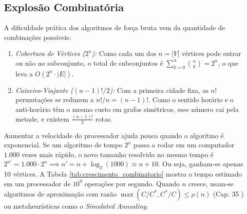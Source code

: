 \documentclass[conference]{IEEEtran}
\theoremstyle{definition}
\theoremstyle{plain}
\begin{document}
\subsection{Explosão Combinatória}

A dificuldade prática dos algoritmos de força bruta vem da quantidade de combinações possíveis:
\begin{enumerate}
    \item \textit{Cobertura de Vértices ($2^n$):} Como cada um dos $n = |V|$ vértices pode entrar ou não no subconjunto, o total de subconjuntos é $\sum_{k=0}^{n} \binom{n}{k} = 2^n$, o que leva a $O(2^n \cdot |E|)$.
    \item \textit{Caixeiro-Viajante ($(n-1)!/2$):} Com a primeira cidade fixa, as $n!$ permutações se reduzem a $n!/n = (n-1)!$. Como o sentido horário e o anti-horário têm o mesmo custo em grafos simétricos, esse número cai pela metade, e existem $\frac{(n-1)!}{2}$ rotas.
\end{enumerate}

Aumentar a velocidade do processador ajuda pouco quando o algoritmo é exponencial. Se um algoritmo de tempo $2^n$ passa a rodar em um computador $1.000$ vezes mais rápido, o novo tamanho resolvido no mesmo tempo é $2^{n'} = 1{.}000 \cdot 2^n \implies n' = n + \log_2(1000) \approx n + 10$. Ou seja, ganham-se apenas 10 vértices. A Tabela \ref{tab:crescimento_combinatorio} mostra o tempo estimado em um processador de $10^9$ operações por segundo. Quando $n$ cresce, usam-se algoritmos de aproximação com razão $\max(C/C^*, C^*/C) \le \rho(n)$ (Cap. 35 \cite{cormen2012algoritmos}) ou metaheurísticas como o \textit{Simulated Annealing}.
\end{document}
